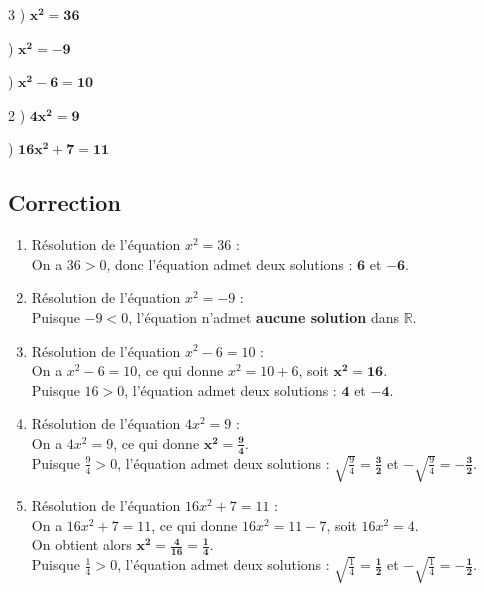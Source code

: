 \documentclass[12pt,a4paper]{article}
\begin{document}
\vspace{0.3cm}
\begin{multicols}{3}
) $\mathbf{x^2 = 36}$

\columnbreak

) $\mathbf{x^2 = -9}$

\columnbreak

) $\mathbf{x^2 - 6 = 10}$
\end{multicols}

\vspace{0.2cm}
\begin{multicols}{2}
) $\mathbf{4x^2 = 9}$

\columnbreak

) $\mathbf{16x^2 + 7 = 11}$
\end{multicols}
\subsection*{\color{myred} Correction }
\begin{enumerate}
    \item Résolution de l'équation $x^2 = 36$ : \\
    On a $36 > 0$, donc l'équation admet deux solutions : $\mathbf{6}$ et $\mathbf{-6}$.

    \item Résolution de l'équation $x^2 = -9$ : \\
    Puisque $-9 < 0$, l'équation n'admet \textbf{aucune solution} dans $\mathbb{R}$.

    \item Résolution de l'équation $x^2 - 6 = 10$ : \\
    On a $x^2 - 6 = 10$, ce qui donne $x^2 = 10 + 6$, soit $\mathbf{x^2 = 16}$. \\
    Puisque $16 > 0$, l'équation admet deux solutions : $\mathbf{4}$ et $\mathbf{-4}$.

    \item Résolution de l'équation $4x^2 = 9$ : \\
    On a $4x^2 = 9$, ce qui donne $\mathbf{x^2 = \frac{9}{4}}$. \\
    Puisque $\frac{9}{4} > 0$, l'équation admet deux solutions : $\sqrt{\frac{9}{4}} = \mathbf{\frac{3}{2}}$ et $-\sqrt{\frac{9}{4}} = \mathbf{-\frac{3}{2}}$.

    \item Résolution de l'équation $16x^2 + 7 = 11$ : \\
    On a $16x^2 + 7 = 11$, ce qui donne $16x^2 = 11 - 7$, soit $16x^2 = 4$. \\
    On obtient alors $\mathbf{x^2 = \frac{4}{16} = \frac{1}{4}}$. \\
    Puisque $\frac{1}{4} > 0$, l'équation admet deux solutions : $\sqrt{\frac{1}{4}} = \mathbf{\frac{1}{2}}$ et $-\sqrt{\frac{1}{4}} = \mathbf{-\frac{1}{2}}$.
\end{enumerate}
\end{document}
